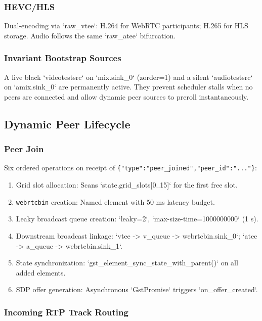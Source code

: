\documentclass{article}
\begin{document}
\subsubsection{HEVC/HLS}

Dual-encoding via `raw\_vtee`: H.264 for WebRTC participants; H.265 for HLS storage.
Audio follows the same `raw\_atee` bifurcation.

\subsubsection{Invariant Bootstrap Sources}

A live black `videotestsrc` on `mix.sink\_0` (zorder=1) and a silent `audiotestsrc`
on `amix.sink\_0` are permanently active. They prevent scheduler stalls when no peers
are connected and allow dynamic peer sources to preroll instantaneously.

\subsection{Dynamic Peer Lifecycle}

\subsubsection{Peer Join}

Six ordered operations on receipt of \texttt{\{"type":"peer\_joined","peer\_id":"..."\}}:

\begin{enumerate}
\item Grid slot allocation: Scans `state.grid\_slots[0..15]` for the first free slot.
\item \texttt{webrtcbin} creation: Named element with 50 ms latency budget.
\item Leaky broadcast queue creation: `leaky=2`, `max-size-time=1000000000` (1 s).
\item Downstream broadcast linkage: `vtee -> v\_queue -> webrtcbin.sink\_0`; `atee -> a\_queue -> webrtcbin.sink\_1`.
\item State synchronization: `gst\_element\_sync\_state\_with\_parent()` on all added elements.
\item SDP offer generation: Asynchronous `GstPromise` triggers `on\_offer\_created`.
\end{enumerate}

\subsubsection{Incoming RTP Track Routing}
\end{document}
